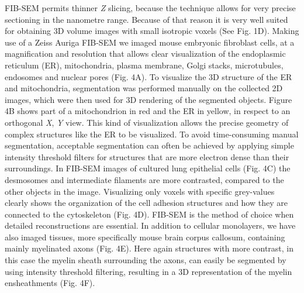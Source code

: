 \documentclass{article}
\begin{document}
FIB-SEM permits thinner \textit{Z} slicing, because the technique allows for very precise sectioning in the nanometre range. Because of that reason it is very well suited for obtaining 3D volume images with small isotropic voxels (See Fig. 1D). Making use of a Zeiss Auriga FIB-SEM we imaged mouse embryonic fibroblast cells, at a magnification and resolution that allows clear visualization of the endoplasmic reticulum (ER), mitochondria, plasma membrane, Golgi stacks, microtubules, endosomes and nuclear pores (Fig. 4A). To visualize the 3D structure of the ER and mitochondria, segmentation was performed manually on the collected 2D images, which were then used for 3D rendering of the segmented objects. Figure 4B shows part of a mitochondrion in red and the ER in yellow, in respect to an orthogonal \textit{X}, \textit{Y} view. This kind of visualization allows the precise geometry of complex structures like the ER to be visualized. To avoid time-consuming manual segmentation, acceptable segmentation can often be achieved by applying simple intensity threshold filters for structures that are more electron dense than their surroundings. In FIB-SEM images of cultured lung epithelial cells (Fig. 4C) the desmosomes and intermediate filaments are more contrasted, compared to the other objects in the image. Visualizing only voxels with specific grey-values clearly shows the organization of the cell adhesion structures and how they are connected to the cytoskeleton (Fig. 4D). FIB-SEM is the method of choice when detailed reconstructions are essential. In addition to cellular monolayers, we have also imaged tissues, more specifically mouse brain corpus callosum, containing mainly myelinated axons (Fig. 4E). Here again structures with more contrast, in this case the myelin sheath surrounding the axons, can easily be segmented by using intensity threshold filtering, resulting in a 3D representation of the myelin ensheathments (Fig. 4F).
\end{document}

